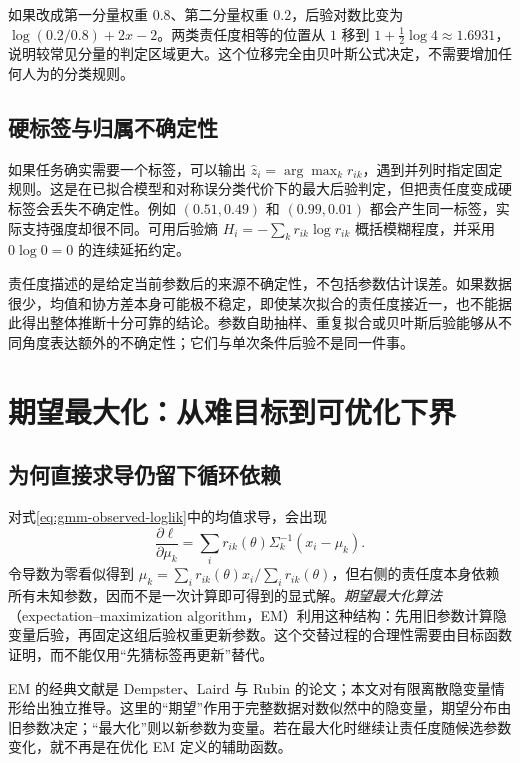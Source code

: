 \documentclass[UTF8,12pt,a4paper,fontset=fandol]{ctexart}
\begin{document}
如果改成第一分量权重 $0.8$、第二分量权重 $0.2$，后验对数比变为 $\log(0.2/0.8)+2x-2$。两类责任度相等的位置从 $1$ 移到 $1+\tfrac12\log4\approx1.6931$，说明较常见分量的判定区域更大。这个位移完全由贝叶斯公式决定，不需要增加任何人为的分类规则。

\subsection{硬标签与归属不确定性}
如果任务确实需要一个标签，可以输出 $\widehat z_i=\arg\max_kr_{ik}$，遇到并列时指定固定规则。这是在已拟合模型和对称误分类代价下的最大后验判定，但把责任度变成硬标签会丢失不确定性。例如 $(0.51,0.49)$ 和 $(0.99,0.01)$ 都会产生同一标签，实际支持强度却很不同。可用后验熵 $H_i=-\sum_kr_{ik}\log r_{ik}$ 概括模糊程度，并采用 $0\log0=0$ 的连续延拓约定。

责任度描述的是给定当前参数后的来源不确定性，不包括参数估计误差。如果数据很少，均值和协方差本身可能极不稳定，即使某次拟合的责任度接近一，也不能据此得出整体推断十分可靠的结论。参数自助抽样、重复拟合或贝叶斯后验能够从不同角度表达额外的不确定性；它们与单次条件后验不是同一件事。

\section{期望最大化：从难目标到可优化下界}
\label{sec:gmm-em-principle}

\subsection{为何直接求导仍留下循环依赖}
对式\eqref{eq:gmm-observed-loglik}中的均值求导，会出现
\[
\frac{\partial\ell}{\partial\mu_k}
=\sum_i r_{ik}(\theta)\Sigma_k^{-1}(x_i-\mu_k).
\]
令导数为零看似得到 $\mu_k=\sum_i r_{ik}(\theta)x_i/\sum_i r_{ik}(\theta)$，但右侧的责任度本身依赖所有未知参数，因而不是一次计算即可得到的显式解。\emph{期望最大化算法}（expectation--maximization algorithm，EM）利用这种结构：先用旧参数计算隐变量后验，再固定这组后验权重更新参数。这个交替过程的合理性需要由目标函数证明，而不能仅用“先猜标签再更新”替代。

EM 的经典文献是 Dempster、Laird 与 Rubin 的论文\cite{dempster1977}；本文对有限离散隐变量情形给出独立推导。这里的“期望”作用于完整数据对数似然中的隐变量，期望分布由旧参数决定；“最大化”则以新参数为变量。若在最大化时继续让责任度随候选参数变化，就不再是在优化 EM 定义的辅助函数。
\end{document}
